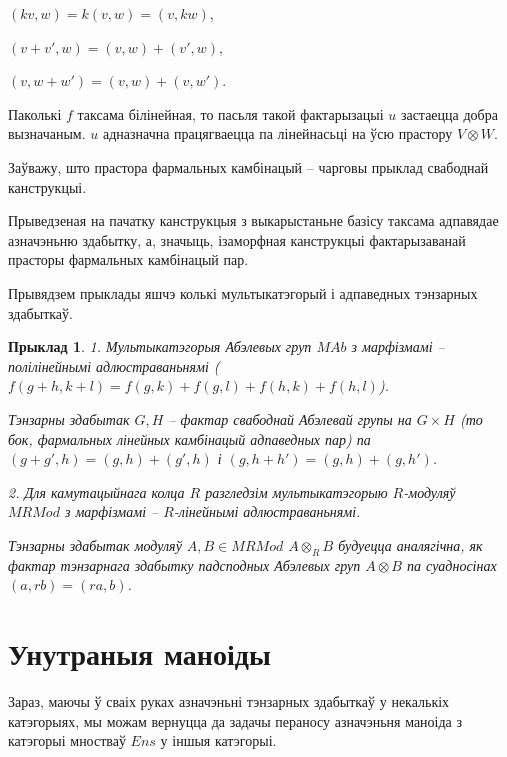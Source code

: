 \documentclass[a4paper,12pt]{book}
\newtheorem{example}{Прыклад}[section]
\begin{document}
$(kv, w) = k(v, w) = (v, kw)$,

$(v + v', w) = (v, w) + (v', w)$,

$(v, w + w') = (v, w) + (v, w')$.

Паколькі $f$ таксама білінейная, то пасьля такой фактарызацыі $u$
застаецца добра вызначаным. $u$ адназначна працягваецца па лінейнасьці
на ўсю прастору $V \otimes W$.

Заўважу, што прастора фармальных камбінацый -- чарговы прыклад
свабоднай канструкцыі.

Прыведзеная на пачатку канструкцыя з выкарыстаньне базісу таксама
адпавядае азначэньню здабытку, а, значыць, ізаморфная канструкцыі
фактарызаванай прасторы фармальных камбінацый пар.

Прывядзем прыклады яшчэ колькі мультыкатэгорый і адпаведных тэнзарных
здабыткаў.

\begin{example}
  1. Мультыкатэгорыя Абэлевых груп $MAb$ з марфізмамі -- полілінейнымі
  адлюстраваньнямі ($f(g + h, k + l) = f(g, k) + f(g, l) + f(h, k) +
  f(h, l)$).

  Тэнзарны здабытак $G, H$ -- фактар свабоднай Абэлевай групы на $G
  \times H$ (то бок, фармальных лінейных камбінацый адпаведных пар) па
  $(g + g', h) = (g, h) + (g', h)$ і $(g, h + h') = (g, h) + (g, h')$.

  2. Для камутацыйнага колца $R$ разгледзім мультыкатэгорыю
  $R$-модуляў $MRMod$ з марфізмамі -- $R$-лінейнымі адлюстраваньнямі.

  Тэнзарны здабытак модуляў $A, B \in MRMod$ $A \otimes_R B$ будуецца
  аналягічна, як фактар тэнзарнага здабытку падсподных Абэлевых груп
  $A \otimes B$ па суадносінах $(a, rb) = (ra, b)$.
\end{example}

\section{Унутраныя маноіды}

Зараз, маючы ў сваіх руках азначэньні тэнзарных здабыткаў у некалькіх
катэгорыях, мы можам вернуцца да задачы пераносу азначэньня маноіда з
катэгорыі мностваў $Ens$ у іншыя катэгорыі.
\end{document}

